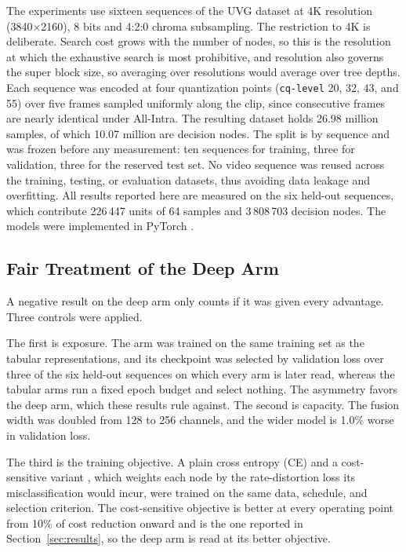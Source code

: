 \documentclass{article}
\begin{document}
The experiments use sixteen sequences of the UVG dataset \cite{uvg} at 4K
resolution (3840$\times$2160), 8 bits and 4:2:0 chroma subsampling. The
restriction to 4K is deliberate. Search cost grows with the number of nodes, so
this is the resolution at which the exhaustive search is most prohibitive, and
resolution also governs the super block size, so averaging over resolutions
would average over tree depths. Each sequence was encoded at four quantization
points (\texttt{cq-level} 20, 32, 43, and 55) over five frames sampled uniformly
along the clip, since consecutive frames are nearly identical under All-Intra.
The resulting dataset holds 26.98 million samples, of which 10.07 million are
decision nodes. The split is by sequence and was frozen before any measurement:
ten sequences for training, three for validation, three for the reserved test
set. No video sequence was reused across the training, testing, or evaluation
datasets, thus avoiding data leakage and overfitting. All results reported here
are measured on the six held-out sequences, which contribute 226\,447 units of
64 samples and 3\,808\,703 decision nodes. The models were implemented in
PyTorch \cite{pytorch}.

\subsection{Fair Treatment of the Deep Arm}
\label{ssec:fairness}

A negative result on the deep arm only counts if it was given every advantage.
Three controls were applied.

The first is exposure. The arm was trained on the same training set as the
tabular representations, and its checkpoint was selected by validation loss over
three of the six held-out sequences on which every arm is later read, whereas
the tabular arms run a fixed epoch budget and select nothing. The asymmetry
favors the deep arm, which these results rule against. The second is capacity.
The fusion width was doubled from 128 to 256 channels, and the wider model is
1.0\% worse in validation loss.

The third is the training objective. A plain cross entropy (CE) and a
cost-sensitive variant \cite{elkan}, which weights each node by the
rate-distortion loss its misclassification would incur, were trained on the same
data, schedule, and selection criterion. The cost-sensitive objective is better
at every operating point from 10\% of cost reduction onward and is the one
reported in Section~\ref{sec:results}, so the deep arm is read at its better
objective.
\end{document}
